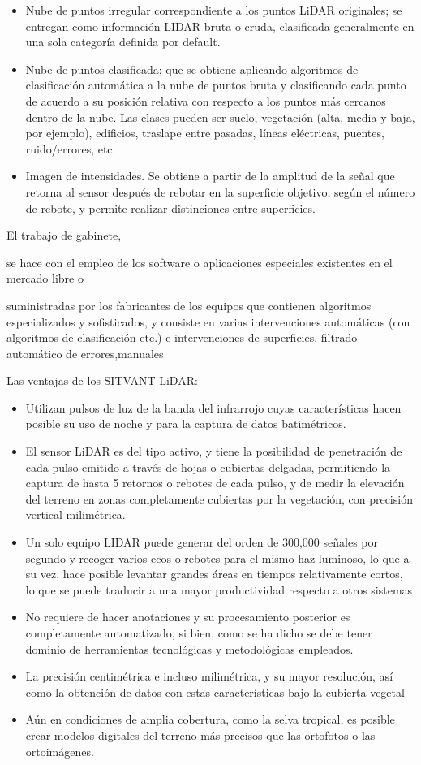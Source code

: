 \begin{itemize}
    \item Nube de puntos irregular correspondiente a los puntos LiDAR originales; se entregan como información LIDAR bruta o cruda, clasificada generalmente en una sola categoría definida por default.
    \item Nube de puntos clasificada; que se obtiene aplicando algoritmos de clasificación automática a la nube de puntos bruta y clasificando cada punto de acuerdo a su posición relativa con respecto a los puntos más cercanos dentro de la nube. Las clases pueden ser suelo, vegetación (alta, media y baja, por ejemplo), edificios, traslape entre pasadas, líneas eléctricas, puentes, ruido/errores, etc.
    \item Imagen de intensidades. Se obtiene a partir de la amplitud de la señal que retorna al sensor después de rebotar en la superficie objetivo, según el número de rebote, y permite realizar distinciones entre superficies.
\end{itemize}

El trabajo de gabinete,

se hace con el empleo de los software o aplicaciones especiales existentes en el mercado libre o

suministradas por los fabricantes de los equipos que contienen algoritmos especializados y sofisticados, y consiste en varias intervenciones automáticas (con algoritmos de clasificación etc.) e intervenciones
de superficies, filtrado automático de errores,manuales

Las ventajas de los SITVANT-LiDAR:
\begin{itemize}
    \item Utilizan pulsos de luz de la banda del infrarrojo cuyas características hacen posible su uso de noche y para la captura de datos batimétricos.
    \item El sensor LiDAR es del tipo activo, y tiene la posibilidad de penetración de cada pulso emitido a través de hojas o cubiertas delgadas, permitiendo la captura de hasta 5 retornos o rebotes de cada pulso, y de medir la elevación del terreno en zonas completamente cubiertas por la vegetación, con precisión vertical milimétrica.
    \item Un solo equipo LIDAR puede generar del orden de 300,000 señales por segundo y recoger varios ecos o rebotes para el mismo haz luminoso, lo que a su vez, hace posible levantar grandes áreas en tiempos relativamente cortos, lo que se puede traducir a una mayor productividad respecto a otros sistemas
    \item No requiere de hacer anotaciones y su procesamiento posterior es completamente automatizado, si bien, como se ha dicho se debe tener dominio de herramientas tecnológicas y metodológicas empleados.
    \item La precisión centimétrica e incluso milimétrica, y su mayor resolución, así como la obtención de datos con estas características bajo la cubierta vegetal
    \item Aún en condiciones de amplia cobertura, como la selva tropical, es posible crear modelos digitales del terreno más precisos que las ortofotos o las ortoimágenes.
\end{itemize}

